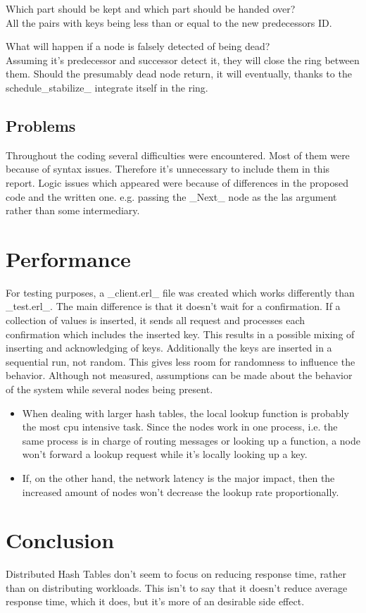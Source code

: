 \documentclass[a4paper, 11pt]{article}
\begin{document}
Which part should be kept and which part should be handed over?
\\All the pairs with keys being less than or equal to the new predecessors ID.


What will happen if a node is falsely detected of being dead?
\\Assuming it's predecessor and successor detect it, they will close the ring between them.
Should the presumably dead node return, it will eventually, thanks to the schedule_stabilize_ integrate itself in the ring.
\subsection{Problems}
Throughout the coding several difficulties were encountered. Most of them were because of syntax issues.
Therefore it's unnecessary to include them in this report.
Logic issues which appeared were because of differences in the proposed code and the written one. e.g. passing the _Next_ node as the las argument rather than some intermediary.

 \section{Performance}
For testing purposes, a _client.erl_ file was created which works differently than _test.erl_.
The main difference is that it doesn't wait for a confirmation.
If a collection of values is inserted, it sends all request and processes each confirmation which includes the inserted key.
This results in a possible mixing of inserting and acknowledging of keys.
Additionally the keys are inserted in a sequential run, not random.
This gives less room for randomness to influence the behavior.
Although not measured, assumptions can be made about the behavior of the system while several nodes being present.
\begin{itemize}
    \item When dealing with larger hash tables, the local lookup function is probably the most cpu intensive task.
    Since the nodes work in one process, i.e. the same process is in charge of routing messages or looking up a function, a node won't forward a lookup request while it's locally looking up a key.
    \item If, on the other hand, the network latency is the major impact, then the increased amount of nodes won't decrease the lookup rate proportionally.
\end{itemize}

\section{Conclusion}
Distributed Hash Tables don't seem to focus on reducing response time, rather than on distributing workloads.
This isn't to say that it doesn't reduce average response time, which it does, but it's more of an desirable side effect.
 
\end{document}
